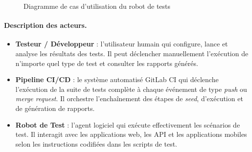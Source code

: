\begin{figure}[H]
\caption{Diagramme de cas d'utilisation du robot de tests}
\label{fig:use-case-diagram}
\end{figure}

\paragraph{Description des acteurs.}
\begin{itemize}[nosep]
    \item \textbf{Testeur / Développeur} : l'utilisateur humain qui configure, lance et analyse les résultats des tests. Il peut déclencher manuellement l'exécution de n'importe quel type de test et consulter les rapports générés.
    \item \textbf{Pipeline CI/CD} : le système automatisé GitLab CI qui déclenche l'exécution de la suite de tests complète à chaque événement de type \textit{push} ou \textit{merge request}. Il orchestre l'enchaînement des étapes de \textit{seed}, d'exécution et de génération de rapports.
    \item \textbf{Robot de Test} : l'agent logiciel qui exécute effectivement les scénarios de test. Il interagit avec les applications web, les API et les applications mobiles selon les instructions codifiées dans les scripts de test.
\end{itemize}


